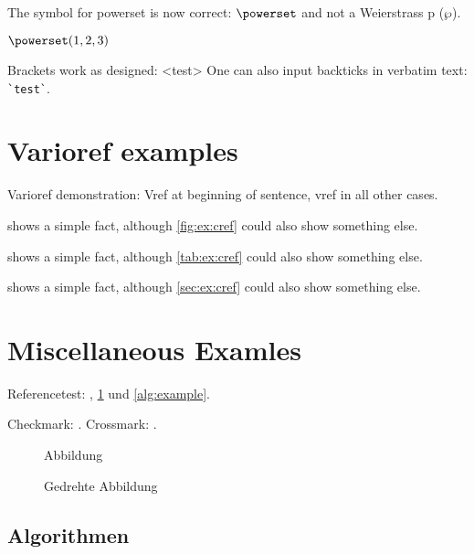 \documentclass[
  fontsize=10pt,
  numbers=noenddot,
  english,  %
  paper=a5,
  twoside,  %
  DIV=calc,
  headings=small,
  bibliography=totoc,
  listof=totoc,
  draft=false
]{scrbook}
\theoremstyle{break}
\newcommand{\dingcheck}{\ding{51}}
\newcommand{\dingcross}{\ding{55}}
\begin{document}
\begin{ltgexample}
The symbol for powerset is now correct: $\powerset$ and not a Weierstrass p ($\wp$).

$\powerset({1,2,3})$
\end{ltgexample}

\begin{ltgexample}
Brackets work as designed:
<test>
One can also input backticks in verbatim text: \verb|`test`|.
\end{ltgexample}


\section{Varioref examples}
\label{sec:ex:vref}

Varioref demonstration: Vref at beginning of sentence, vref in all other cases.

\begin{ltgexample}
 shows a simple fact, although \vref{fig:ex:cref} could also show something else.

 shows a simple fact, although \vref{tab:ex:cref} could also show something else.

 shows a simple fact, although \vref{sec:ex:cref} could also show something else.
\end{ltgexample}
\section{Miscellaneous Examles}
\label{ssec:example}

Referencetest: , \cref{fig:Abbildung} und \cref{alg:example}.

\begin{ltgexample}
Checkmark: \dingcheck.
Crossmark: \dingcross.
\end{ltgexample}

\begin{figure}
  \missingfigure{}
  \caption{Abbildung}
  \label{fig:Abbildung}
\end{figure}

\begin{landscape}
  \begin{figure}
    \missingfigure{}
    \caption{Gedrehte Abbildung}
    \label{fig:AbbildungGedreht}
  \end{figure}
\end{landscape}

\subsection{Algorithmen}
\end{document}
